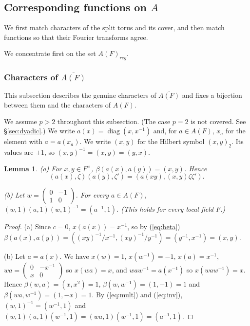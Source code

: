 \documentclass[12pt,letterpaper,openany]{book}
\theoremstyle{plain}
\newtheorem{lemma}[theorem]{Lemma}
\theoremstyle{definition}
\theoremstyle{remark}
\theoremstyle{remark}
\begin{document}
\subsection{Corresponding functions on \texorpdfstring{$A$}{A}}

We first match characters of the split torus and its cover, and then match functions so that their Fourier transforms agree.


We concentrate first on the set $A(F)_{reg}$.

\subsubsection{Characters of \texorpdfstring{$\overline{A(F)}$}{A(F)-bar}}\label{sec:charsA}

This subsection describes the genuine characters of $\overline{A(F)}$ and fixes a bijection between them and the characters of $A(F)$.


We assume $p>2$ throughout this subsection. (The case $p=2$ is
not covered. See \S\ref{sec:dyadic}.) We write $a(x)=\operatorname{diag}(x,x^{-1})$
and, for $a\in A(F)$, $x_a$ for the element with $a=a(x_a)$. We write
$(x,y)$ for the Hilbert symbol $(x,y)_2$. Its values are $\pm1$, so
$(x,y)^{-1}=(x,y)=(y,x)$.

\begin{lemma}\label{lem:Acocycle}
(a) For $x,y\in F^\times$, $\beta(a(x),a(y))=(x,y)$. Hence
\[
(a(x),\zeta)(a(y),\zeta')=(a(xy),(x,y)\zeta\zeta').
\]

(b) Let $w=\left(\begin{smallmatrix}0&-1\\1&0\end{smallmatrix}\right)$.
For every $a\in A(F)$, $(w,1)(a,1)(w,1)^{-1}=(a^{-1},1)$.
(This holds for every local field $F$.)
\end{lemma}

\begin{proof}
(a) Since $c=0$, $x(a(x))=x^{-1}$, so by (\ref{eq:beta})
$\beta(a(x),a(y))=((xy)^{-1}/x^{-1},(xy)^{-1}/y^{-1})=(y^{-1},x^{-1})=(x,y)$.

(b) Let $a=a(x)$. We have $x(w)=1$, $x(w^{-1})=-1$, $x(a)=x^{-1}$,
$wa=\left(\begin{smallmatrix}0&-x^{-1}\\x&0\end{smallmatrix}\right)$ so
$x(wa)=x$, and $waw^{-1}=a(x^{-1})$ so $x(waw^{-1})=x$. Hence
$\beta(w,a)=(x,x^2)=1$, $\beta(w,w^{-1})=(1,-1)=1$ and
$\beta(wa,w^{-1})=(1,-x)=1$. By (\ref{eq:mult}) and (\ref{eq:inv}),
$(w,1)^{-1}=(w^{-1},1)$ and
$(w,1)(a,1)(w^{-1},1)=(wa,1)(w^{-1},1)=(a^{-1},1)$.
\end{proof}
\end{document}
